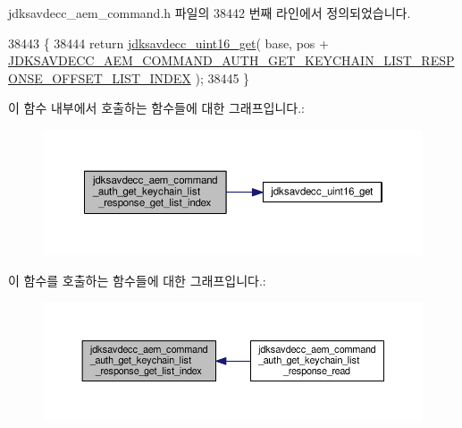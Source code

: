 jdksavdecc\+\_\+aem\+\_\+command.\+h 파일의 38442 번째 라인에서 정의되었습니다.


\begin{DoxyCode}
38443 \{
38444     \textcolor{keywordflow}{return} \hyperlink{group__endian_ga3fbbbc20be954aa61e039872965b0dc9}{jdksavdecc\_uint16\_get}( base, pos + 
      \hyperlink{group__command__auth__get__keychain__list__response_gace9350ce8ee70cdad64a1d1e768b961b}{JDKSAVDECC\_AEM\_COMMAND\_AUTH\_GET\_KEYCHAIN\_LIST\_RESPONSE\_OFFSET\_LIST\_INDEX}
       );
38445 \}
\end{DoxyCode}


이 함수 내부에서 호출하는 함수들에 대한 그래프입니다.\+:
\nopagebreak
\begin{figure}[H]
\begin{center}
\leavevmode
\includegraphics[width=350pt]{group__command__auth__get__keychain__list__response_ga2a77f4181b7f59ee692a3c64f0d5396b_cgraph}
\end{center}
\end{figure}




이 함수를 호출하는 함수들에 대한 그래프입니다.\+:
\nopagebreak
\begin{figure}[H]
\begin{center}
\leavevmode
\includegraphics[width=350pt]{group__command__auth__get__keychain__list__response_ga2a77f4181b7f59ee692a3c64f0d5396b_icgraph}
\end{center}
\end{figure}


